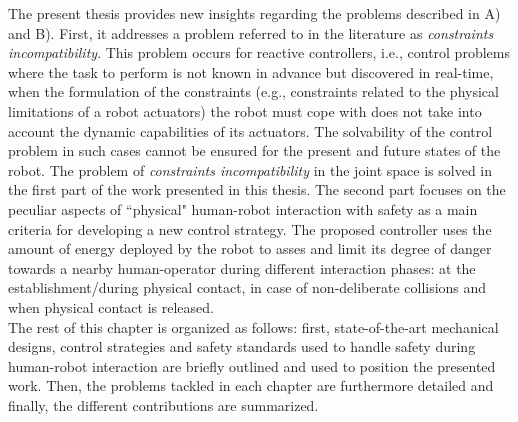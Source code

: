The present thesis provides new insights regarding the problems described in A) and B). First, it addresses a problem referred to in the literature as \textit{constraints incompatibility}. This problem occurs for reactive controllers, i.e., control problems where the task to perform is not known in advance but discovered in real-time, when the formulation of the constraints (e.g., constraints related to the physical limitations of a robot actuators) the robot must cope with does not take into account the dynamic capabilities of its actuators. The solvability of the control problem in such cases cannot be ensured for the present and future states of the robot. The problem of \textit{constraints incompatibility} in the joint space is solved in the first part of the work presented in this thesis. The second part focuses on the peculiar aspects of ``physical" human-robot interaction with safety as a main criteria for developing a new control strategy. The proposed controller uses the amount of energy deployed by the robot to asses and limit its degree of danger towards a nearby human-operator during different interaction phases: at the establishment/during physical contact, in case of non-deliberate collisions and when physical contact is released. \\
The rest of this chapter is organized as follows: first, state-of-the-art mechanical designs, control strategies and safety standards used to handle safety during human-robot interaction are briefly outlined and used to position the presented work. Then, the problems tackled in each chapter are furthermore detailed and finally, the different contributions are summarized.
